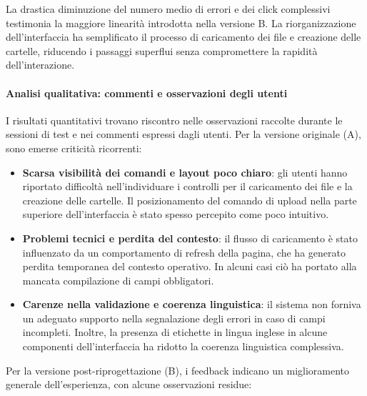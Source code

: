 La drastica diminuzione del numero medio di errori e dei click complessivi testimonia la maggiore linearità introdotta nella versione B. La riorganizzazione dell'interfaccia ha semplificato il processo di caricamento dei file e creazione delle cartelle, riducendo i passaggi superflui senza compromettere la rapidità dell'interazione.

\paragraph{Analisi qualitativa: commenti e osservazioni degli utenti}

I risultati quantitativi trovano riscontro nelle osservazioni raccolte durante le sessioni di test e nei commenti espressi dagli utenti. Per la versione originale (A), sono emerse criticità ricorrenti:

\begin{itemize}
	\item \textbf{Scarsa visibilità dei comandi e layout poco chiaro}: gli utenti hanno riportato difficoltà nell’individuare i controlli per il caricamento dei file e la creazione delle cartelle. Il posizionamento del comando di upload nella parte superiore dell’interfaccia è stato spesso percepito come poco intuitivo.

	\item \textbf{Problemi tecnici e perdita del contesto}: il flusso di caricamento è stato influenzato da un comportamento di refresh della pagina, che ha generato perdita temporanea del contesto operativo. In alcuni casi ciò ha portato alla mancata compilazione di campi obbligatori.

	\item \textbf{Carenze nella validazione e coerenza linguistica}: il sistema non forniva un adeguato supporto nella segnalazione degli errori in caso di campi incompleti. Inoltre, la presenza di etichette in lingua inglese in alcune componenti dell’interfaccia ha ridotto la coerenza linguistica complessiva.
\end{itemize}

Per la versione post-riprogettazione (B), i feedback indicano un miglioramento generale dell’esperienza, con alcune osservazioni residue:


